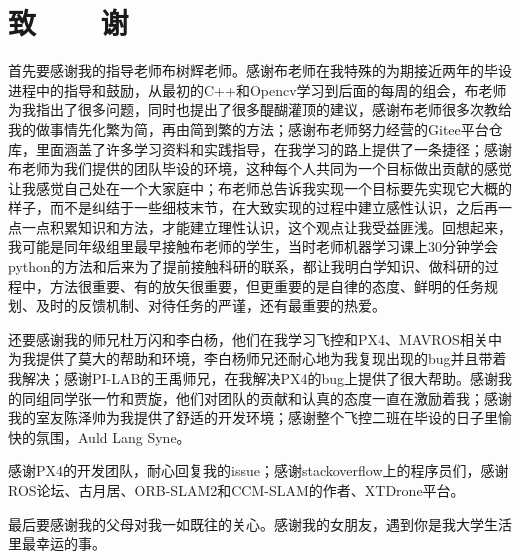 

\renewcommand{\baselinestretch}{1.5}
\fontsize{12pt}{13pt}\selectfont

\chapter*{致~~~~谢}

首先要感谢我的指导老师布树辉老师。感谢布老师在我特殊的为期接近两年的毕设进程中的指导和鼓励，从最初的C++和Opencv学习到后面的每周的组会，布老师为我指出了很多问题，同时也提出了很多醍醐灌顶的建议，感谢布老师很多次教给我的做事情先化繁为简，再由简到繁的方法；感谢布老师努力经营的Gitee平台仓库，里面涵盖了许多学习资料和实践指导，在我学习的路上提供了一条捷径；感谢布老师为我们提供的团队毕设的环境，这种每个人共同为一个目标做出贡献的感觉让我感觉自己处在一个大家庭中；布老师总告诉我实现一个目标要先实现它大概的样子，而不是纠结于一些细枝末节，在大致实现的过程中建立感性认识，之后再一点一点积累知识和方法，才能建立理性认识，这个观点让我受益匪浅。回想起来，我可能是同年级组里最早接触布老师的学生，当时老师机器学习课上30分钟学会python的方法和后来为了提前接触科研的联系，都让我明白学知识、做科研的过程中，方法很重要、有的放矢很重要，但更重要的是自律的态度、鲜明的任务规划、及时的反馈机制、对待任务的严谨，还有最重要的热爱。

还要感谢我的师兄杜万闪和李白杨，他们在我学习飞控和PX4、MAVROS相关中为我提供了莫大的帮助和环境，李白杨师兄还耐心地为我复现出现的bug并且带着我解决；感谢PI-LAB的王禹师兄，在我解决PX4的bug上提供了很大帮助。感谢我的同组同学张一竹和贾旋，他们对团队的贡献和认真的态度一直在激励着我；感谢我的室友陈泽帅为我提供了舒适的开发环境；感谢整个飞控二班在毕设的日子里愉快的氛围，Auld Lang Syne。

感谢PX4的开发团队，耐心回复我的issue；感谢stackoverflow上的程序员们，感谢ROS论坛、古月居、ORB-SLAM2和CCM-SLAM的作者、XTDrone平台。

最后要感谢我的父母对我一如既往的关心。感谢我的女朋友，遇到你是我大学生活里最幸运的事。

